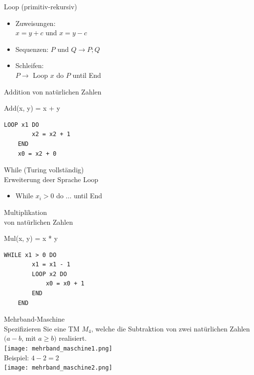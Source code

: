 \begin{minipage}{0.5\linewidth}
    \begin{KR}{Loop (primitiv-rekursiv)}
        \begin{itemize}
            \item Zuweisungen:\\ $x = y + c$ und $x = y - c$
            \item Sequenzen: $P$ und $Q \rightarrow P; Q$
            \item Schleifen:\\ $P \rightarrow$ Loop $x$ do $P$ until End
        \end{itemize}
    \end{KR}
    
    \begin{example2}{Addition von natürlichen Zahlen}
    
        Add(x, y) = x + y
    \begin{lstlisting}[style=Pseudocode]
    LOOP x1 DO
        x2 = x2 + 1
    END
    x0 = x2 + 0
    \end{lstlisting}
    \end{example2}
\end{minipage}
\begin{minipage}{0.5\linewidth}
    \begin{KR}{While (Turing vollständig)}\\
        Erweiterung deer Sprache Loop
        \begin{itemize}
            \item While $x_i > 0$ do ... until End
        \end{itemize}
    \end{KR}
    
    \begin{example2}{Multiplikation \\von natürlichen Zahlen}
        
        Mul(x, y) = x * y
    \begin{lstlisting}[style=Pseudocode]
    WHILE x1 > 0 DO
        x1 = x1 - 1
        LOOP x2 DO
            x0 = x0 + 1
        END
    END
    \end{lstlisting}
    \end{example2}
\end{minipage}


\begin{example2}{Mehrband-Maschine}\\
    Spezifizieren Sie eine TM $M_{4}$, welche die Subtraktion von zwei natürlichen Zahlen $(a-b$, mit $a \geq b)$ realisiert.\\
    \texttt{[image: mehrband\_maschine1.png]}\\
    Beispiel: $4-2=2$\\
    \texttt{[image: mehrband\_maschine2.png]}
\end{example2}

